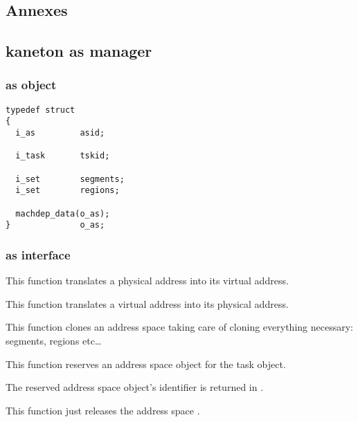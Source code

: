 \subsection*{Annexes}

\subsection{kaneton as manager}

\subsubsection{as object}

\begin{verbatim}
typedef struct
{
  i_as         asid;

  i_task       tskid;

  i_set        segments;
  i_set        regions;

  machdep_data(o_as);
}              o_as;
\end{verbatim}

\subsubsection{as interface}

	 {
	   This function translates a physical address into its virtual
	   address.
	 }

	 {
	   This function translates a virtual address into its physical
	   address.
	 }

	 {
	   This function clones an address space taking care of cloning
	   everything necessary: segments, regions etc\ldots
	 }

	 {
	   This function reserves an address space object for the
	   task  object.

	   The reserved address space object's identifier is returned
	   in .
	 }

	 {
	   This function just releases the address space .
	 }

